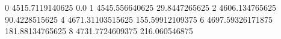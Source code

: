 0 4515.7119140625 0.0
1 4545.556640625 29.8447265625
2 4606.134765625 90.4228515625
4 4671.31103515625 155.59912109375
6 4697.59326171875 181.88134765625
8 4731.7724609375 216.060546875
